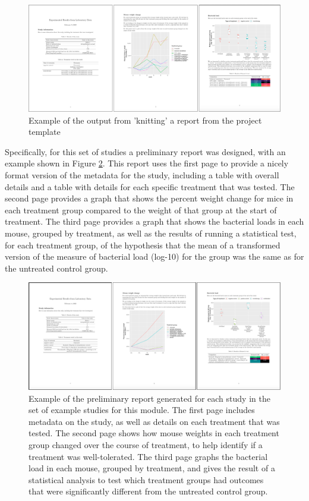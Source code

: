 \documentclass[]{tufte-book}
\begin{document}
\begin{figure}
\includegraphics[width=\textwidth]{figures/project_example_report_study001} \caption[Example of the output from 'knitting' a report from the project template]{Example of the output from 'knitting' a report from the project template}\label{fig:examplereport1}
\end{figure}

Specifically, for this set of studies a preliminary report was designed, with an
example shown in Figure \ref{fig:prelimreport}. This report uses the first page
to provide a nicely format version of the metadata for the study, including a
table with overall details and a table with details for each specific treatment
that was tested. The second page provides a graph that shows the percent weight
change for mice in each treatment group compared to the weight of that group at
the start of treatment. The third page provides a graph that shows the bacterial
loads in each mouse, grouped by treatment, as well as the results of running a
statistical test, for each treatment group, of the hypothesis that the mean
of a transformed version of the measure of bacterial load (log-10) for the group
was the same as for the untreated control group.

\begin{figure}
\includegraphics[width=\textwidth]{figures/project_prelim_report} \caption[Example of the preliminary report generated for each study in the set of example studies for this module]{Example of the preliminary report generated for each study in the set of example studies for this module. The first page includes metadata on the study, as well as details on each treatment that was tested. The second page shows how mouse weights in each treatment group changed over the course of treatment, to help identify if a treatment was well-tolerated. The third page graphs the bacterial load in each mouse, grouped by treatment, and gives the result of a statistical analysis to test which treatment groups had outcomes that were significantly different from the untreated control group.}\label{fig:prelimreport}
\end{figure}
\end{document}

